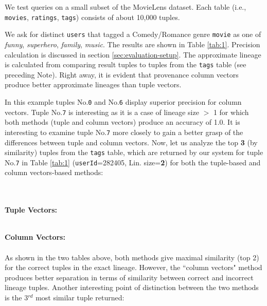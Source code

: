 \begin{runexample}
We test queries on a small subset of the MovieLens dataset. Each table (i.e., \texttt{movies}, \texttt{ratings}, \texttt{tags}) consists of about 10,000 tuples.
\end{runexample}

% 
\begin{example-withrun}\label{experiment:1}



We ask for distinct \texttt{users} that tagged a Comedy/Romance genre \texttt{movie} as one of \textit{funny}, \textit{superhero}, \textit{family}, \textit{music}. The results are shown in Table \ref{tab:1}. Precision calculation is discussed in section \ref{sec:evaluation-setup}. The approximate lineage is calculated from comparing result tuples to tuples from the \texttt{tags} table (see preceding Note). Right away, it is evident that provenance column vectors produce better approximate lineages than tuple vectors.\\
\par In this example tuples No.\texttt{0} and No.\texttt{6} display superior precision for column vectors. Tuple No.\texttt{7} is  interesting as it is a case of lineage size $>$ 1 for which both methods (tuple and column vectors) produce an accuracy of 1.0.
It is interesting to examine tuple No.\texttt{7} more closely to gain a better grasp of the differences between tuple and column vectors.
Now, let us analyze the top \textbf{3} (by similarity) tuples from the \texttt{tags} table, which are returned by our system for tuple No.\texttt{7} in Table \ref{tab:1} (\texttt{userId}=282405, Lin. size=\textbf{2}) for both the tuple-based and column vectors-based methods:\\\\\\
\par\textbf{Tuple Vectors:}\\
\\
\par\textbf{Column Vectors:}\\

\\
As shown in the two tables above, both methods give maximal similarity (top 2) for the correct tuples in the exact lineage. However, the ``column vectors" method produces better separation in terms of similarity between correct and incorrect lineage tuples. Another interesting point of distinction between the two methods is the 3$^{rd}$ most similar tuple returned:

\end{example-withrun}
